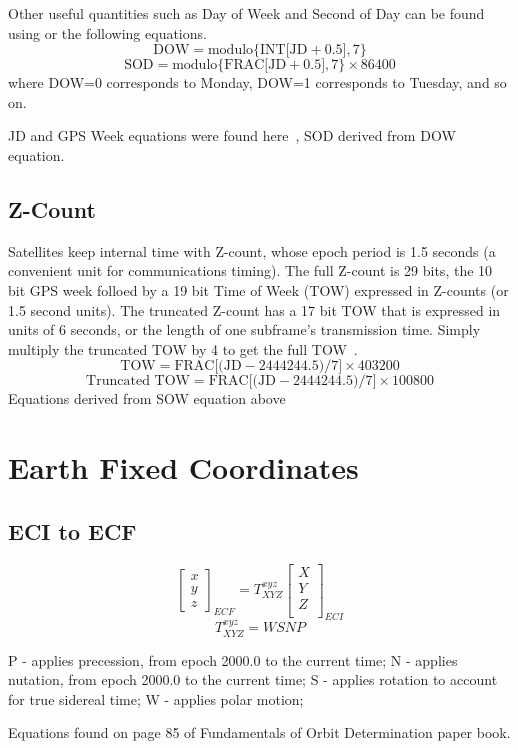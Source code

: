Other useful quantities such as Day of Week and  Second of Day can be found using  or the following equations.
\[\mbox{DOW}=\mbox{modulo\{INT[JD}+0.5],7\}\]
\[\mbox{SOD}=\mbox{modulo\{FRAC[JD}+0.5],7\}\times 86400\]
where DOW=0 corresponds to Monday, DOW=1 corresponds to Tuesday, and so on.

JD and GPS Week equations were found here~\cite[pp. 36-37]{hlc:gtp}, SOD derived from DOW equation.
\subsection{Z-Count}
Satellites keep internal time with Z-count, whose epoch period is 1.5 seconds (a convenient unit for communications timing). The full Z-count is 29 bits, the 10 bit GPS week folloed by a 19 bit Time of Week (TOW) expressed in Z-counts (or 1.5 second units). The truncated Z-count has a 17 bit TOW that is expressed in units of 6 seconds, or the length of one subframe's transmission time. Simply multiply the truncated TOW by 4 to get the full TOW~\cite[pp. 86-88]{tsui:fgpsr}.
\[ \mbox{TOW}=\mbox{FRAC[(JD}-2444244.5)/7]\times 403200 \]
\[ \mbox{Truncated TOW}=\mbox{FRAC[(JD}-2444244.5)/7]\times 100800 \]
Equations derived from SOW equation above
\section{Earth Fixed Coordinates}
\subsection{ECI to ECF}
\[\left[\begin{array}{c} x \\ y \\ z \end{array}\right]_{ECF}=T_{XYZ}^{xyz}\left[\begin{array}{c} X \\ Y \\ Z \\ \end{array}\right]_{ECI}\]
\[T_{XYZ}^{xyz}=WSNP\]

P - applies precession, from epoch 2000.0 to the current time;
N - applies nutation, from epoch 2000.0 to the current time;
S - applies rotation to account for true sidereal time;
W - applies polar motion;

Equations found on page 85 of Fundamentals of Orbit Determination paper book.

